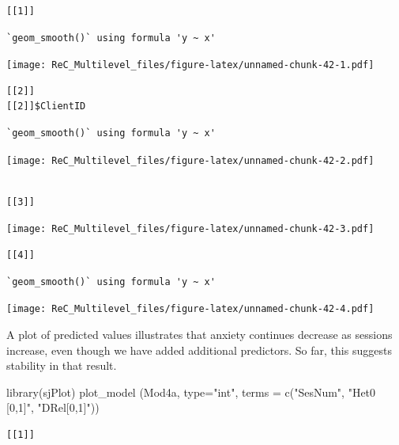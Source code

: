 \documentclass[
  11pt,
]{book}
\newenvironment{Shaded}{\begin{snugshade}}{\end{snugshade}}
\newcommand{\AttributeTok}[1]{\textcolor[rgb]{0.77,0.63,0.00}{#1}}
\newcommand{\FunctionTok}[1]{\textcolor[rgb]{0.00,0.00,0.00}{#1}}
\newcommand{\NormalTok}[1]{#1}
\newcommand{\StringTok}[1]{\textcolor[rgb]{0.31,0.60,0.02}{#1}}
\begin{document}
\begin{verbatim}
[[1]]
\end{verbatim}

\begin{verbatim}
`geom_smooth()` using formula 'y ~ x'
\end{verbatim}

\texttt{[image: ReC\_Multilevel\_files/figure-latex/unnamed-chunk-42-1.pdf]}

\begin{verbatim}
[[2]]
[[2]]$ClientID
\end{verbatim}

\begin{verbatim}
`geom_smooth()` using formula 'y ~ x'
\end{verbatim}

\texttt{[image: ReC\_Multilevel\_files/figure-latex/unnamed-chunk-42-2.pdf]}

\begin{verbatim}

[[3]]
\end{verbatim}

\texttt{[image: ReC\_Multilevel\_files/figure-latex/unnamed-chunk-42-3.pdf]}

\begin{verbatim}
[[4]]
\end{verbatim}

\begin{verbatim}
`geom_smooth()` using formula 'y ~ x'
\end{verbatim}

\texttt{[image: ReC\_Multilevel\_files/figure-latex/unnamed-chunk-42-4.pdf]}

A plot of predicted values illustrates that anxiety continues decrease as sessions increase, even though we have added additional predictors. So far, this suggests stability in that result.

\begin{Shaded}
\begin{Highlighting}[]
\FunctionTok{library}\NormalTok{(sjPlot)}
\FunctionTok{plot\_model}\NormalTok{ (Mod4a, }\AttributeTok{type=}\StringTok{"int"}\NormalTok{, }\AttributeTok{terms =} \FunctionTok{c}\NormalTok{(}\StringTok{"SesNum"}\NormalTok{, }\StringTok{"Het0 [0,1]"}\NormalTok{, }\StringTok{"DRel[0,1]"}\NormalTok{))}
\end{Highlighting}
\end{Shaded}

\begin{verbatim}
[[1]]
\end{verbatim}
\end{document}
